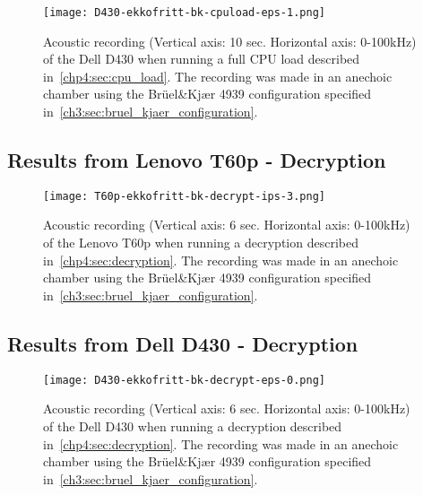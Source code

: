 \begin{figure}[ht]
    \centering
    \texttt{[image: D430-ekkofritt-bk-cpuload-eps-1.png]}
    \caption{Acoustic recording (Vertical axis: 10 sec. Horizontal axis: 0-100kHz) of the Dell D430 when running a full CPU load described in~\autoref{chp4:sec:cpu_load}. The recording was made in an anechoic chamber using the Brüel\&Kjær 4939 configuration specified in~\autoref{ch3:sec:bruel_kjaer_configuration}. }
    \label{fig:D430-ekkofritt-bk-cpuload-eps-1}
\end{figure}


\subsection{Results from Lenovo T60p - Decryption}\label{chp5:subsec:t60p_bk_results_decryption}

\begin{figure}[ht]
    \centering
    \texttt{[image: T60p-ekkofritt-bk-decrypt-ips-3.png]}
    \caption{Acoustic recording (Vertical axis: 6 sec. Horizontal axis: 0-100kHz) of the Lenovo T60p when running a decryption described in~\autoref{chp4:sec:decryption}. The recording was made in an anechoic chamber using the Brüel\&Kjær 4939 configuration specified in~\autoref{ch3:sec:bruel_kjaer_configuration}. }
    \label{fig:T60p-ekkofritt-bk-decrypt-ips-3}
\end{figure}

\subsection{Results from Dell D430 - Decryption}\label{chp5:subsec:d430_bk_results_cpuload}

\begin{figure}[ht]
    \centering
    \texttt{[image: D430-ekkofritt-bk-decrypt-eps-0.png]}
    \caption{Acoustic recording (Vertical axis: 6 sec. Horizontal axis: 0-100kHz) of the Dell D430 when running a decryption described in~\autoref{chp4:sec:decryption}. The recording was made in an anechoic chamber using the Brüel\&Kjær 4939 configuration specified in~\autoref{ch3:sec:bruel_kjaer_configuration}.}
    \label{fig:D430-ekkofritt-bk-decrypt-eps-0}
\end{figure}


